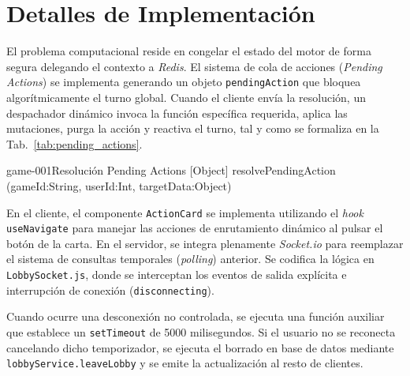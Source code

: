 \section{Detalles de Implementación}
El problema computacional reside en congelar el estado del motor de forma segura delegando el contexto a \textit{Redis}. El sistema de cola de acciones (\textit{Pending Actions}) se implementa generando un objeto \texttt{pendingAction} que bloquea algorítmicamente el turno global. Cuando el cliente envía la resolución, un despachador dinámico invoca la función específica requerida, aplica las mutaciones, purga la acción y reactiva el turno, tal y como se formaliza en la Tab.~\ref{tab:pending_actions}.

\begin{table}[htbp]
\centering
\begin{asigResponsabilidad}{game-001}{Resolución Pending Actions}
{[Object] resolvePendingAction (gameId:String, userId:Int, targetData:Object)}
\end{asigResponsabilidad}
\caption{Descripción algorítmica de la resolución de acciones asíncronas en el servidor. \label{tab:pending_actions}}
\end{table}

En el cliente, el componente \texttt{ActionCard} se implementa utilizando el \textit{hook} \texttt{useNavigate} para manejar las acciones de enrutamiento dinámico al pulsar el botón de la carta. En el servidor, se integra plenamente \textit{Socket.io} para reemplazar el sistema de consultas temporales (\textit{polling}) anterior. Se codifica la lógica en \texttt{LobbySocket.js}, donde se interceptan los eventos de salida explícita e interrupción de conexión (\texttt{disconnecting}). 

Cuando ocurre una desconexión no controlada, se ejecuta una función auxiliar que establece un \texttt{setTimeout} de 5000 milisegundos. Si el usuario no se reconecta cancelando dicho temporizador, se ejecuta el borrado en base de datos mediante \texttt{lobbyService.leaveLobby} y se emite la actualización al resto de clientes.

